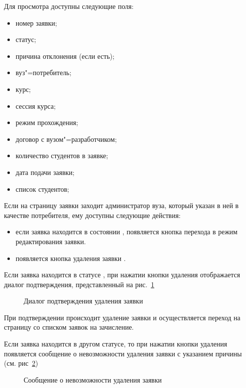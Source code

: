 Для просмотра доступны следующие поля:
\begin{itemize}
	\item номер заявки;
	\item статус;
	\item причина отклонения (если есть);
	\item вуз"=потребитель;
	\item курс;
	\item сессия курса;
	\item режим прохождения;
	\item договор с вузом"=разработчиком;
	\item количество студентов в заявке;
	\item дата подачи заявки;
	\item список студентов;
\end{itemize}

Если на страницу заявки заходит администратор вуза, который указан в ней в качестве потребителя, ему доступны 
следующие действия:
\begin{itemize}
	\item если заявка находится в состоянии , появляется кнопка перехода в режим 
	редактирования заявки. 
	\item появляется кнопка удаления заявки .
\end{itemize}

Если заявка находится в статусе , при нажатии кнопки удаления отображается диалог подтверждения, 
представленный на рис.~\ref{img:student:req_delete_confirm} 
\begin{figure}[H]
	\caption{Диалог подтверждения удаления заявки}
	\label{img:student:req_delete_confirm}
\end{figure}
При подтверждении происходит удаление заявки и осуществляется переход на страницу со списком заявок на зачисление.

Если заявка находится в другом статусе, то при нажатии кнопки удаления появляется сообщение о невозможности удаления 
заявки с указанием причины (см. рис~\ref{img:student:req_cannot_delete})
\begin{figure}[H]
	\caption{Сообщение о невозможности удаления заявки}
	\label{img:student:req_cannot_delete}
\end{figure}


